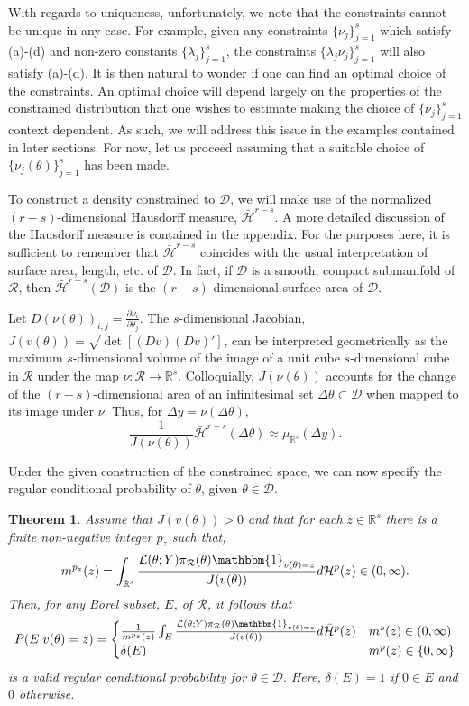 \documentclass[12 point]{article}
\newtheorem{theorem_rcp}{Theorem}
\begin{document}
With regards to uniqueness, unfortunately, we note that the constraints cannot be unique in any case.  For example, given any constraints $\{\nu_{j}\}_{j=1}^s$ which satisfy (a)-(d) and non-zero constants $\{\lambda_j\}_{j=1}^s$, the constraints $\{\lambda_j \nu_j\}_{j=1}^s$ will also satisfy (a)-(d). It is then natural to wonder if one can find an optimal choice of the  constraints. An optimal choice will depend largely on the properties of the constrained distribution that one wishes to estimate making the choice of $\{\nu_j\}_{j=1}^s$ context dependent.  As such, we will address this issue in the examples contained in later sections. For now, let us proceed assuming that a suitable choice of $\{\nu_j(\theta)\}_{j=1}^s$ has been made.

To construct a density constrained to $\mathcal{D}$, we will make use of the normalized $(r-s)$-dimensional Hausdorff measure, $\bar{\mathcal{H}}^{r-s}$. A more detailed discussion of the Hausdorff measure is contained in the appendix.  For the purposes here, it is sufficient to remember that $\bar{\mathcal{H}}^{r-s}$ coincides with the usual interpretation of surface area, length, etc. of $\mathcal{D}.$  In fact, if $\mathcal{D}$ is a smooth, compact submanifold of $\mathcal{R}$, then $\bar{\mathcal{H}}^{r-s}(\mathcal{D})$ is the $(r-s)$-dimensional surface area of $\mathcal{D}.$  

Let $D(\nu(\theta))_{i,j}=\frac{\partial \nu_i}{\partial \theta_j}.$ The $s$-dimensional Jacobian, $J(v(\theta)) = \sqrt{\det[(Dv)(Dv)']}$, can be interpreted geometrically as the maximum $s$-dimensional volume of the image of a unit cube $s$-dimensional cube in $\mathcal{R}$ under the map $\nu:\mathcal{R} \to \mathbb{R}^s.$ Colloquially, $J(\nu(\theta))$ accounts for the change of the $(r-s)$-dimensional area of an infinitesimal set $\Delta \theta \subset \mathcal {D}$ when mapped to its image under $\nu$.  Thus, for $\Delta y =\nu (\Delta \theta)$, $$\frac{1}{J(\nu(\theta))}\bar{\mathcal{H}}^{r-s}(\Delta \theta) \approx  \mu_{\mathbb{R}^s}(\Delta y).$$ 

Under the given construction of the constrained space, we can now specify the regular conditional probability of $\theta$, given $\theta \in \mathcal{D}.$
\begin{theorem_rcp}
\label{THM:RCP_construction}
Assume that $J(v(\theta)) > 0$ and that for each $z\in\mathbb{R}^s$ there is a finite non-negative integer $p_z$ such that,  $$m^{p_z}(z) = \int_{\mathbb{R}^s} \frac{\mathcal{L}(\theta; Y) \pi_\mathcal{R}(\theta) \mathbbm{1}_{v(\theta)=z}}{J(v(\theta))} d\bar{\mathcal{H}}^{p}(z) \in (0,\infty).$$
Then, for any Borel subset, $E$, of $\mathcal{R}$, it follows that 
$$P(E|v(\theta) = z) = 
\begin{cases}
\frac{1}{m^{p_z}(z)} \int_E \frac{\mathcal{L}(\theta; Y) \pi_\mathcal{R}(\theta) \mathbbm{1}_{v(\theta)=z}}{J(v(\theta))} d\bar{\mathcal{H}}^{p}(z)  & m^s(z)\in (0,\infty)  \\
\delta (E) & m^p(z) \in \{0,\infty\}
\end{cases}$$
is a valid regular conditional probability for $\theta\in\mathcal{D}.$ Here, $\delta (E)=1$ if $0\in E$ and $0$ otherwise. 
\end{theorem_rcp}
\end{document}
